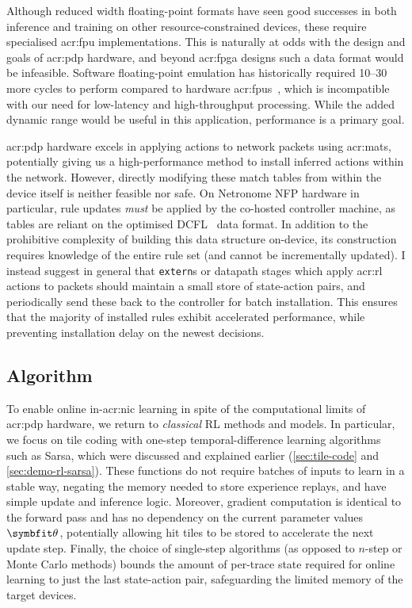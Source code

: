 Although reduced width floating-point formats have seen good successes in both inference and training on other resource-constrained devices, these require specialised \gls{acr:fpu} implementations.
This is naturally at odds with the design and goals of \gls{acr:pdp} hardware, and beyond \gls{acr:fpga} designs such a data format would be infeasible.
Software floating-point emulation has historically required \qtyrange{10}{30}{\times} more cycles to perform compared to hardware \glspl{acr:fpu}~\parencite{DBLP:conf/arith/IordacheT03}, which is incompatible with our need for low-latency and high-throughput processing.
While the added dynamic range would be useful in this application, performance is a primary goal.

\gls{acr:pdp} hardware excels in applying actions to network packets using \glspl{acr:mat}, potentially giving us a high-performance method to install inferred actions within the network.
However, directly modifying these match tables from within the device itself is neither feasible nor safe.
On Netronome NFP hardware in particular, rule updates \emph{must} be applied by the co-hosted controller machine, as tables are reliant on the optimised DCFL~\parencite{DBLP:conf/infocom/TaylorT05} data format.
In addition to the prohibitive complexity of building this data structure on-device, its construction requires knowledge of the entire rule set (and cannot be incrementally updated).
I instead suggest in general that \texttt{extern}s or datapath stages which apply \gls{acr:rl} actions to packets should maintain a small store of state-action pairs, and periodically send these back to the controller for batch installation.
This ensures that the majority of installed rules exhibit accelerated performance, while preventing installation delay on the newest decisions.

\subsection{Algorithm}\label{sec:opal-algorithm}
%
%
%
To enable online in-\gls{acr:nic} learning in spite of the computational limits of \gls{acr:pdp} hardware, we return to \emph{classical} RL methods and models.
In particular, we focus on tile coding with one-step temporal-difference learning algorithms such as Sarsa, which were discussed and explained earlier (\cref{sec:tile-code} and \cref{sec:demo-rl-sarsa}).
These functions do not require batches of inputs to learn in a stable way, negating the memory needed to store experience replays, and have simple update and inference logic.
Moreover, gradient computation is identical to the forward pass and has no dependency on the current parameter values $\wvec{}$, potentially allowing hit tiles to be stored to accelerate the next update step.
Finally, the choice of single-step algorithms (as opposed to $n$-step or Monte Carlo methods) bounds the amount of per-trace state required for online learning to just the last state-action pair, safeguarding the limited memory of the target devices.

